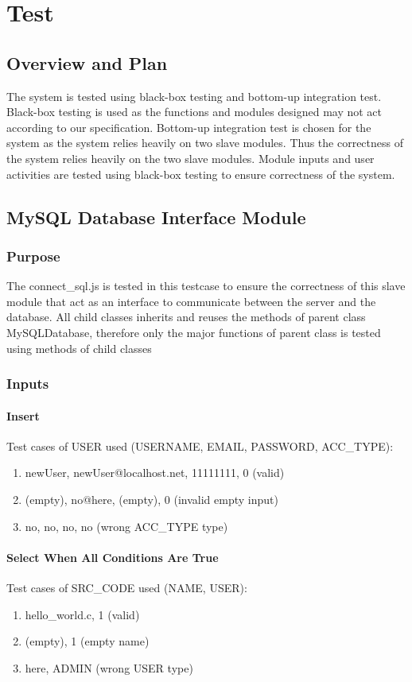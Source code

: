 \chapter{Test}
\section{Overview and Plan}
The system is tested using black-box testing and bottom-up integration test. Black-box testing is used as the functions and modules designed may not act according to our specification. Bottom-up integration test is chosen for the system as the system relies heavily on two slave modules. Thus the correctness of the system relies heavily on the two slave modules. Module inputs and user activities are tested using black-box testing to ensure correctness of the system.

\section{MySQL Database Interface Module}
\subsection{Purpose}
The connect\_sql.js is tested in this testcase to ensure the correctness of this slave module that act as an interface to communicate between the server and the database. All child classes inherits and reuses the methods of parent class MySQLDatabase, therefore only the major functions of parent class is tested using methods of child classes

\subsection{Inputs}
\subsubsection{Insert}
Test cases of USER used (USERNAME, EMAIL, PASSWORD, ACC\_TYPE):
\begin{enumerate}
  \item newUser, newUser@localhost.net, 11111111, 0 (valid)
  \item (empty), no@here, (empty), 0 (invalid empty input)
  \item no, no, no, no (wrong ACC\_TYPE type)
\end{enumerate}

\subsubsection{Select When All Conditions Are True}
Test cases of SRC\_CODE used (NAME, USER):
\begin{enumerate}
  \item hello\_world.c, 1 (valid)
  \item (empty), 1 (empty name)
  \item here, ADMIN (wrong USER type)
\end{enumerate}

